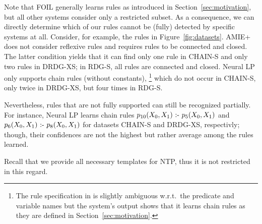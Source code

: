 Note that FOIL generally learns rules as introduced in Section~\ref{sec:motivation}, but all other systems consider only a restricted subset. 
As a consequence, we can directly determine which of our rules cannot be (fully) detected by specific systems at all. 
Consider, for example, the rules in Figure~\ref{fig:datasets}.
% 
AMIE+ does not consider reflexive rules and 
requires rules to be connected and closed.
The latter condition yields that it can find only one rule in CHAIN-S and only two rules in DRDG-XS; in RDG-S, all rules are connected and closed.
% 
Neural LP only supports chain rules (without constants),%
\footnote{The rule specification in \cite{YaYaCo-NIPS17:neurallp} is slightly ambiguous w.r.t.\ the predicate and variable names but the system's output shows that it learns chain rules as they are defined in Section~\ref{sec:motivation}.}
which do not occur in CHAIN-S, only twice in DRDG-XS, but four times in RDG-S.

Nevertheless, rules that are not fully supported can still be recognized partially.
For instance, Neural LP learns chain rules
$p_{10}(X_0,X_1) \text{ :- } p_5(X_0,X_1)$ and
$p_6(X_0,X_1) \text{ :- } p_8(X_0,X_1)$ for datasets CHAIN-S and DRDG-XS, respectivly; though, their confidences are not the highest but rather average among the rules learned.

Recall that we provide all necessary templates for NTP, thus it is not restricted in this regard. %


